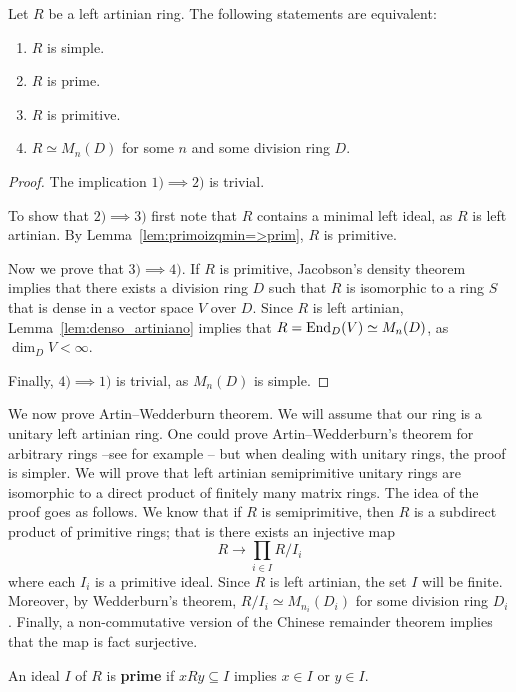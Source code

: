 \begin{theorem}[Wedderburn]
	Let $R$ be a left artinian ring. The following statements are equivalent:
	\begin{enumerate}
		\item $R$ is simple.
		\item $R$ is prime.
		\item $R$ is primitive.
		\item $R\simeq M_n(D)$ for some $n$ and some division ring $D$.
	\end{enumerate}
\end{theorem}

\begin{proof}
	The implication $1)\implies2)$ is trivial. 
	
	To show that $2)\implies3)$ first note that 
	$R$ contains a minimal left ideal, as $R$ is left artinian. 
	By Lemma~\ref{lem:primoizqmin=>prim}, $R$ is primitive. 

	Now we prove that $3)\implies4)$. If $R$ is primitive, 
	Jacobson's density theorem implies that there exists a division
	ring $D$ such that  
	$R$ is isomorphic to a ring $S$ that is dense in a vector space $V$ over $D$.
	Since $R$ is left artinian, Lemma~\ref{lem:denso_artiniano} implies that  
	$R=\operatorname{End}_D(V)\simeq M_n(D)$, as $\dim_DV<\infty$. 

	Finally, $4)\implies1)$ is trivial, as $M_n(D)$ is simple. 
\end{proof}

We now prove Artin--Wedderburn theorem. We will assume that our ring
is a unitary left artinian ring. One could prove
Artin--Wedderburn's theorem for arbitrary rings --see for example \cite{MR600654}--  
but when dealing with unitary rings, the proof 
is simpler. We will prove
that left artinian semiprimitive unitary rings
are isomorphic to a direct product
of finitely many matrix rings. The idea of the proof goes as follows. 
We know that if 
$R$ is semiprimitive, then $R$ is a subdirect product
of primitive rings; that is  
there exists an injective map
\[
R\to \prod_{i\in I}R/I_i
\]
where each $I_i$ is a primitive ideal. Since $R$ is left artinian, 
the set $I$ will be finite. Moreover, 
by Wedderburn's theorem, 
$R/I_i\simeq M_{n_i}(D_i)$ for some division ring $D_i$. Finally,
a non-commutative version of the Chinese remainder theorem
implies that the map is fact surjective. 

\begin{definition}
    An ideal $I$ of $R$ is \textbf{prime} if $xRy\subseteq I$ implies
    $x\in I$ or $y\in I$.
\end{definition}

